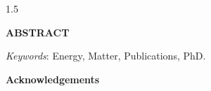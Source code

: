 \documentclass[12pt, twoside,openright]{report}
\begin{document}
\begin{spacing}{1.5}
\begin{titlepage}
\begin{enumerate}
\end{enumerate}


\end{titlepage}




\newpage
\thispagestyle{empty}
\mbox{}
\newpage
\begin{titlepage}
\pagestyle{empty}
\begin{center}
\large \textbf{ABSTRACT}
\end{center}


\hspace*{0cm}
\lipsum[1]
\lipsum[2]

\vspace*{12pt}
\noindent \textit {Keywords}: {Energy, Matter, Publications, PhD.}




\end{titlepage}




\newpage
\thispagestyle{empty}
\mbox{}
\newpage
\begin{titlepage}
\pagestyle{empty}
\begin{center}
\large \textbf{Acknowledgements}
\end{center}



\hspace*{0cm}

\lipsum[1]
\lipsum[2]


\end{titlepage}



\end{spacing}
\end{document}
